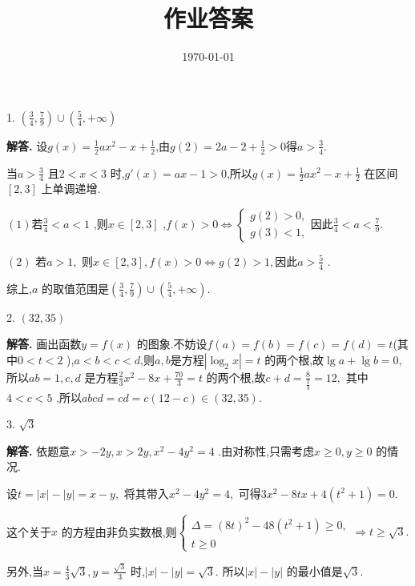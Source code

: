 \documentclass[12pt,a4paper,oneside]{ctexart}
\title{\textbf{作业答案}}
\date{\today}
\newcounter{problemname}
\newenvironment{problem}{\stepcounter{problemname}\par\noindent\textbf{题目\arabic{problemname}. }}{\\\par}
\newenvironment{solution}{\par\noindent\textbf{解答. }}{\\\par}
\newenvironment{note}{\par\noindent\textbf{题目\arabic{problemname}的注记. }}{\\\par}
\begin{document}
\maketitle




1. $ (\frac{3}{4},\frac{7}{9})\cup(\frac{5}{4},+\infty) $ 

\begin{solution}
    设$ g(x)=\frac{1}{2}ax^2-x+\frac{1}{2} $,由$ g(2)=2a-2+\frac{1}{2}>0 $得$ a>\frac{3}{4} $.

    当$ a>\frac{3}{4} $ 且$ 2<x<3 $ 时,$ g'(x)=ax-1>0 $,所以$ g(x)=\frac{1}{2}ax^2-x+\frac{1}{2} $ 在区间$ [2,3] $ 上单调递增.

    $ (1) $若$ \frac{3}{4}<a<1 $ ,则$ x\in[2,3] $ ,$ f(x)>0\Leftrightarrow \begin{cases}
        g(2)>0,\\
        g(3)<1,
    \end{cases} $因此$ \frac{3}{4}<a<\frac{7}{9} $.

    $ (2) $ 若$ a>1, $ 则$ x\in[2,3],f(x)>0\Leftrightarrow g(2)>1, $因此$ a>\frac{5}{4} $ .
    
    综上,$ a $ 的取值范围是$ (\frac{3}{4},\frac{7}{9})\cup(\frac{5}{4},+\infty) $. 
\end{solution}

2. $ (32,35) $ 

\begin{solution}
    画出函数$ y=f(x) $ 的图象.不妨设$ f(a)=f(b)=f(c)=f(d)=t $(其中$ 0<t<2 $ ),$ a<b<c<d $,则$ a,b $是方程$ |\log_2 x|=t $ 的两个根,故$ \lg a+\lg b=0, $  所以$ ab=1,c,d $ 是方程$ \frac{2}{3}x^2-8x+\frac{70}{3}=t $ 的两个根,故$ c+d=\frac{8}{\frac{2}{3}}=12, $ 其中$ 4<c<5 $ ,所以$ abcd=cd=c(12-c)\in(32,35). $ 
\end{solution}

3. $ \sqrt{3} $ 

\begin{solution}
    依题意$ x>-2y,x>2y,x^2-4y^2=4 $ .由对称性,只需考虑$ x\geqslant 0,y\geqslant 0 $ 的情况.

    设$ t=|x|-|y|=x-y, $ 将其带入$ x^2-4y^2=4, $ 可得$ 3x^2-8tx+4(t^2+1)=0. $ 

    这个关于$ x $ 的方程由非负实数根,则$ \begin{cases}
        \Delta=(8t)^2-48(t^2+1)\geqslant 0,\\
        t\geqslant 0
    \end{cases}\Rightarrow t\geqslant \sqrt{3}. $ 

    另外,当$ x=\frac{4}{3}\sqrt{3},y=\frac{\sqrt{3}}{3} $ 时,$ |x|-|y|=\sqrt{3}. $ 所以$ |x|-|y| $ 的最小值是$ \sqrt{3}. $ 
\end{solution}
\end{document}
